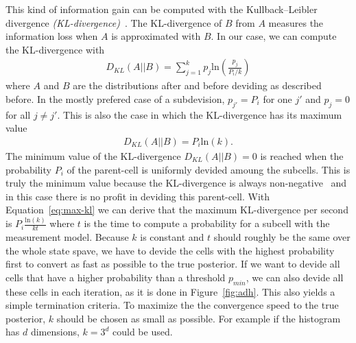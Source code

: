 \documentclass[twoside,a4paper,article]{combine}
\begin{document}
This kind of information gain can be computed with the
Kullback–Leibler divergence \textit{(KL-divergence)}~\cite{kl-divergence}. The
KL-divergence of $B$ from $A$ measures the information loss when $A$
is approximated with $B$. In our case, we can compute the
KL-divergence with
\begin{align}
  D_{KL}(A||B)=\sum_{j=1}^k p_j \mathrm{ln}\left(\frac{p_j}{P_i/k}\right)
\end{align}
where $A$ and $B$ are the distributions after and before deviding as
described before. In the mostly prefered case of a subdevision,
$p_{j'}=P_i$ for one $j'$ and $p_j=0$ for all $j\neq j'$. This is also
the case in which the KL-divergence has its maximum value
\begin{align}
  D_{KL}(A||B)=P_i \mathrm{ln}(k) \mathrm{ . }
  \label{eq:max-kl}
\end{align}
The minimum value of the KL-divergence $D_{KL}(A||B)=0$ is reached
when the probability $P_i$ of the parent-cell is uniformly devided
amoung the subcells. This is truly the minimum value because the
KL-divergence is always non-negative~\cite{kl-divergence} and in this
case there is no profit in deviding this parent-cell. With
Equation~\ref{eq:max-kl} we can derive that the maximum KL-divergence
per second is $P_i \frac{\mathrm{ln } (k)}{kt}$ where $t$ is the time
to compute a probability for a subcell with the measurement
model. Because $k$ is constant and $t$ should roughly be the same over
the whole state spave, we have to devide the cells with the highest
probability first to convert as fast as possible to the true
posterior. If we want to devide all cells that have a higher
probability than a threshold $p_{min}$, we can also devide all these
cells in each iteration, as it is done in Figure~\ref{fig:adh}. This
also yields a simple termination criteria. To maximize the the
convergence speed to the true posterior, $k$ should be chosen as small
as possible. For example if the histogram has $d$ dimensions, $k=3^d$
could be used.
\end{document}

